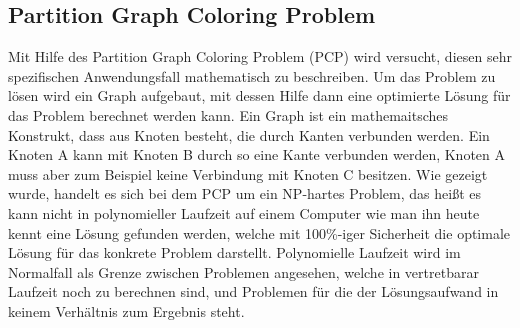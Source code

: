 \subsection{Partition Graph Coloring Problem}
Mit Hilfe des Partition Graph Coloring Problem (PCP) wird versucht, diesen sehr spezifischen Anwendungsfall mathematisch zu beschreiben. Um das Problem zu lösen wird
ein Graph aufgebaut, mit dessen Hilfe dann eine optimierte Lösung für das Problem berechnet werden kann. Ein Graph ist ein mathemaitsches Konstrukt, dass aus Knoten
besteht, die durch Kanten verbunden werden. Ein Knoten A kann mit Knoten B durch so eine Kante verbunden werden, Knoten A muss aber zum Beispiel keine Verbindung mit
Knoten C besitzen. Wie gezeigt wurde, handelt es sich bei dem PCP um ein NP-hartes Problem, das heißt es kann nicht in polynomieller Laufzeit auf einem Computer
wie man ihn heute kennt eine Lösung gefunden werden, welche mit 100\%-iger Sicherheit die optimale Lösung für das konkrete Problem darstellt. Polynomielle Laufzeit
wird im Normalfall als Grenze zwischen Problemen angesehen, welche in vertretbarar Laufzeit noch zu berechnen sind, und Problemen für die der Lösungsaufwand in
keinem Verhältnis zum Ergebnis steht.

